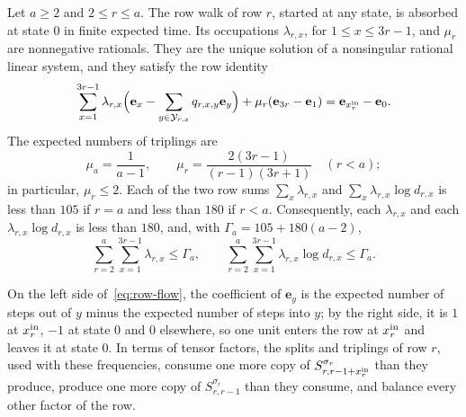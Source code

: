 \begin{proposition}[Occupations]\label{prop:occupations}
Let \(a\ge2\) and \(2\le r\le a\). The row walk of row \(r\), started at
any state, is absorbed at state \(0\) in finite expected time. Its
occupations
\(\lambda_{r,x}\), for \(1\le x\le3r-1\), and \(\mu_r\) are nonnegative
rationals. They are the unique solution of a nonsingular rational linear
system, and they satisfy the row identity
\begin{equation}\label{eq:row-flow}
 \sum_{x=1}^{3r-1}\lambda_{r,x}
 \Bigl(\mathbf e_x-\sum_{y\in\mathcal Y_{r,x}}q_{r,x,y}\mathbf e_y\Bigr)
 +\mu_r(\mathbf e_{3r}-\mathbf e_1)=\mathbf e_{x^{\mathrm{in}}_r}-\mathbf e_0.
\end{equation}
The expected numbers of triplings are
\begin{equation}\label{eq:reset-weights}
 \mu_a=\frac1{a-1},\qquad
 \mu_r=\frac{2(3r-1)}{(r-1)(3r+1)}\quad(r<a);
\end{equation}
in particular, \(\mu_r\le2\). Each of the two row sums
\(\sum_x\lambda_{r,x}\) and \(\sum_x\lambda_{r,x}\log d_{r,x}\) is less
than \(105\) if \(r=a\) and less than \(180\) if \(r<a\). Consequently,
each \(\lambda_{r,x}\) and each \(\lambda_{r,x}\log d_{r,x}\) is less
than \(180\), and, with \(\Gamma_a=105+180(a-2)\),
\begin{equation}\label{eq:occupation-bounds}
 \sum_{r=2}^a\sum_{x=1}^{3r-1}\lambda_{r,x}\le\Gamma_a,
 \qquad
 \sum_{r=2}^a\sum_{x=1}^{3r-1}\lambda_{r,x}\log d_{r,x}\le\Gamma_a.
\end{equation}
\end{proposition}

On the left side of~\eqref{eq:row-flow}, the coefficient of
\(\mathbf e_y\) is the expected number of steps out of \(y\) minus the
expected number of steps into \(y\); by the right side, it is \(1\) at
\(x^{\mathrm{in}}_r\), \(-1\) at state \(0\) and \(0\) elsewhere, so one unit enters
the row at \(x^{\mathrm{in}}_r\) and leaves it at state \(0\). In terms of tensor
factors, the splits and triplings of row \(r\), used with these frequencies, consume
one more copy of \(S^{\sigma_r}_{r,r-1+x^{\mathrm{in}}_r}\) than they produce,
produce one more copy of \(S^{\sigma_r}_{r,r-1}\) than they consume, and
balance every other factor of the row.

